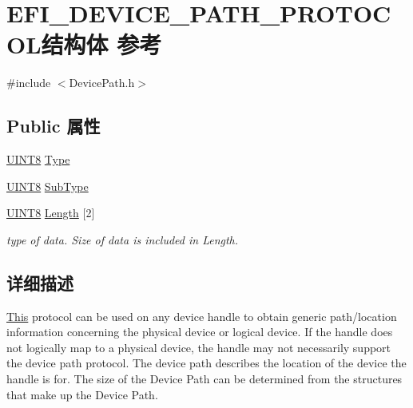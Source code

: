 \hypertarget{struct_e_f_i___d_e_v_i_c_e___p_a_t_h___p_r_o_t_o_c_o_l}{}\section{E\+F\+I\+\_\+\+D\+E\+V\+I\+C\+E\+\_\+\+P\+A\+T\+H\+\_\+\+P\+R\+O\+T\+O\+C\+O\+L结构体 参考}
\label{struct_e_f_i___d_e_v_i_c_e___p_a_t_h___p_r_o_t_o_c_o_l}


{\ttfamily \#include $<$Device\+Path.\+h$>$}

\subsection*{Public 属性}
\begin{DoxyCompactItemize}
\item 
\hyperlink{_processor_bind_8h_ab27e9918b538ce9d8ca692479b375b6a}{U\+I\+N\+T8} \hyperlink{struct_e_f_i___d_e_v_i_c_e___p_a_t_h___p_r_o_t_o_c_o_l_a73ca54766487d7bd7f8d99eedae537d1}{Type}
\item 
\hyperlink{_processor_bind_8h_ab27e9918b538ce9d8ca692479b375b6a}{U\+I\+N\+T8} \hyperlink{struct_e_f_i___d_e_v_i_c_e___p_a_t_h___p_r_o_t_o_c_o_l_acd47ce00df91a29caf6cba0d313ea98e}{Sub\+Type}
\item 
\hyperlink{_processor_bind_8h_ab27e9918b538ce9d8ca692479b375b6a}{U\+I\+N\+T8} \hyperlink{struct_e_f_i___d_e_v_i_c_e___p_a_t_h___p_r_o_t_o_c_o_l_a92e6fd3a9b5ce5f46e01a716ee35f824}{Length} \mbox{[}2\mbox{]}
\begin{DoxyCompactList}\small\item\em type of data. Size of data is included in Length. \end{DoxyCompactList}\end{DoxyCompactItemize}


\subsection{详细描述}
\hyperlink{namespace_this}{This} protocol can be used on any device handle to obtain generic path/location information concerning the physical device or logical device. If the handle does not logically map to a physical device, the handle may not necessarily support the device path protocol. The device path describes the location of the device the handle is for. The size of the Device Path can be determined from the structures that make up the Device Path. 


